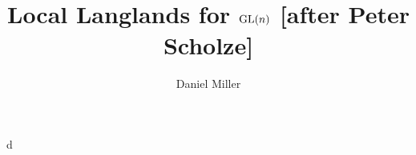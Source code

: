 \documentclass{article}
\title{Local Langlands for $\operatorname{GL}(n)$ [after Peter Scholze]}
\author{Daniel Miller}
\begin{document}
\maketitle





d
\end{document}
